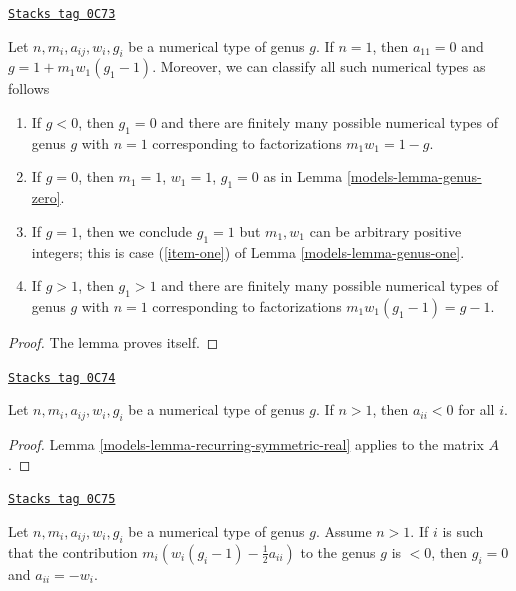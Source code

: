 \begin{lemma}[Irreducible]
\label{models-lemma-irreducible}
\href{https://stacks.math.columbia.edu/tag/0C73}{\texttt{Stacks tag 0C73}}

Let $n, m_i, a_{ij}, w_i, g_i$ be a numerical type of genus $g$.
If $n = 1$, then $a_{11} = 0$ and $g = 1 + m_1w_1(g_1 - 1)$.
Moreover, we can classify all such numerical types as follows
\begin{enumerate}
\item If $g < 0$, then $g_1 = 0$ and there are finitely many possible
numerical types of genus $g$ with $n = 1$ corresponding to factorizations
$m_1w_1 = 1 - g$.
\item If $g = 0$, then $m_1 = 1$, $w_1 = 1$, $g_1 = 0$
as in Lemma \ref{models-lemma-genus-zero}.
\item If $g = 1$, then we conclude $g_1 = 1$ but $m_1, w_1$ can be arbitrary
positive integers; this is case
(\ref{item-one}) of Lemma \ref{models-lemma-genus-one}.
\item If $g > 1$, then $g_1 > 1$ and there are finitely many possible
numerical types of genus $g$ with $n = 1$ corresponding to
factorizations $m_1w_1(g_1 - 1) = g - 1$.
\end{enumerate}
\end{lemma}

\begin{proof}
The lemma proves itself.
\end{proof}

\begin{lemma}
\label{models-lemma-diagonal-negative}
\href{https://stacks.math.columbia.edu/tag/0C74}{\texttt{Stacks tag 0C74}}

Let $n, m_i, a_{ij}, w_i, g_i$ be a numerical type of genus $g$.
If $n > 1$, then $a_{ii} < 0$ for all $i$.
\end{lemma}

\begin{proof}

Lemma \ref{models-lemma-recurring-symmetric-real} applies to the matrix $A$.
\end{proof}

\begin{lemma}
\label{models-lemma-minus-one}
\href{https://stacks.math.columbia.edu/tag/0C75}{\texttt{Stacks tag 0C75}}

Let $n, m_i, a_{ij}, w_i, g_i$ be a numerical type of genus $g$.
Assume $n > 1$. If $i$ is such that the contribution
$m_i(w_i(g_i - 1) - \frac{1}{2} a_{ii})$
to the genus $g$ is $< 0$, then $g_i = 0$ and $a_{ii} = -w_i$.
\end{lemma}

